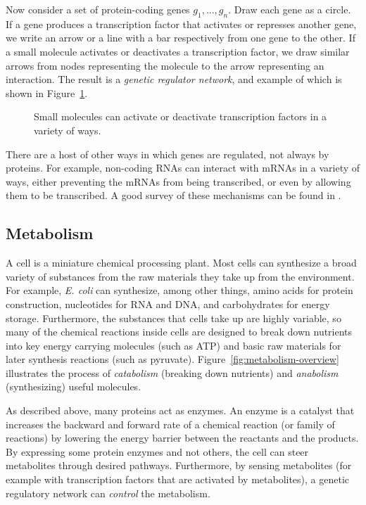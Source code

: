 Now consider a set of protein-coding genes $g_1, ..., g_n$. Draw each
gene as a circle. If a gene produces a transcription factor that
activates or represses another gene, we write an arrow or a line with
a bar respectively from one gene to the other. If a small molecule
activates or deactivates a transcription factor, we draw similar
arrows from nodes representing the molecule to the arrow representing
an interaction. The result is a {\em genetic regulator network}, and
example of which is shown in Figure~\ref{fig:grn}. 

\begin{figure}
\centering
{}
\caption{\label{fig:grn}
  Small molecules can activate or deactivate transcription factors in
  a variety of ways. }
\end{figure}

There are a host of other ways in which genes are regulated, not
always by proteins. For example, non-coding RNAs can interact with
mRNAs in a variety of ways, either preventing the mRNAs from being
transcribed, or even by allowing them to be transcribed. A good survey
of these mechanisms can be found in \cite{rna-synthetic-biology}.

\subsection{Metabolism}

A cell is a miniature chemical processing plant. Most cells can
synthesize a broad variety of substances from the raw materials they
take up from the environment. For example, {\em E. coli} can
synthesize, among other things, amino acids for protein construction,
nucleotides for RNA and DNA, and carbohydrates for energy
storage. Furthermore, the substances that cells take up are highly
variable, so many of the chemical reactions inside cells are designed
to break down nutrients into key energy carrying molecules (such as
ATP) and basic raw materials for later synthesis reactions (such as
pyruvate). Figure~\ref{fig:metabolism-overview} illustrates the
process of {\em catabolism} (breaking down nutrients) and {\em
  anabolism} (synthesizing) useful molecules. 

As described above, many proteins act as enzymes. An enzyme is a
catalyst that increases the backward and forward rate of a chemical
reaction (or family of reactions) by lowering the energy barrier
between the reactants and the products. By expressing some protein
enzymes and not others, the cell can steer metabolites through desired
pathways. Furthermore, by sensing metabolites (for example with
transcription factors that are activated by metabolites), a genetic
regulatory network can {\em control} the metabolism. 


